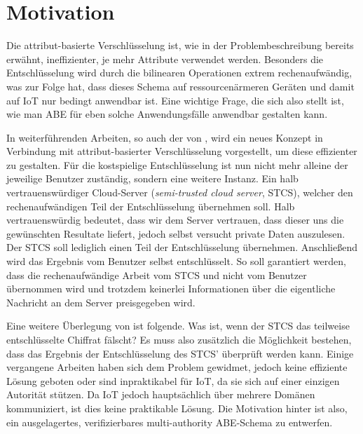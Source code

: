 \section{Motivation}
Die attribut-basierte Verschlüsselung ist, wie in der Problembeschreibung
bereits erwähnt, ineffizienter, je mehr Attribute verwendet werden. Besonders
die Entschlüsselung wird durch die bilinearen Operationen extrem
rechenaufwändig, was zur Folge hat, dass dieses Schema auf ressourcenärmeren
Geräten und damit auf IoT nur bedingt anwendbar ist. Eine wichtige Frage, die
sich also stellt ist, wie man ABE für eben solche Anwendungsfälle anwendbar
gestalten kann.

In weiterführenden Arbeiten, so auch der von \cite{green}, wird ein neues
Konzept in Verbindung mit attribut-basierter Verschlüsselung vorgestellt, um
diese effizienter zu gestalten. Für die kostspielige Entschlüsselung ist nun
nicht mehr alleine der jeweilige Benutzer zuständig, sondern eine weitere
Instanz. Ein halb vertrauenswürdiger Cloud-Server (\textit{semi-trusted cloud
server}, STCS), welcher den rechenaufwändigen Teil der Entschlüsselung
übernehmen soll. Halb vertrauenswürdig bedeutet, dass wir dem Server
vertrauen, dass dieser uns die gewünschten Resultate liefert, jedoch selbst
versucht private Daten auszulesen. Der STCS soll lediglich einen Teil der
Entschlüsselung übernehmen. Anschließend wird das Ergebnis vom Benutzer selbst
entschlüsselt. So soll garantiert werden, dass die rechenaufwändige Arbeit vom
STCS und nicht vom Benutzer übernommen wird und trotzdem keinerlei
Informationen über die eigentliche Nachricht an dem Server preisgegeben wird.

Eine weitere Überlegung von \cite{phoabe} ist folgende. Was ist, wenn der STCS
das teilweise entschlüsselte Chiffrat fälscht? Es muss also zusätzlich die
Möglichkeit bestehen, dass das Ergebnis der Entschlüsselung des STCS'
überprüft werden kann. Einige vergangene Arbeiten haben sich dem Problem
gewidmet, jedoch keine effiziente Lösung geboten oder sind inpraktikabel für
IoT, da sie sich auf einer einzigen Autorität stützen. Da IoT jedoch
hauptsächlich über mehrere Domänen kommuniziert, ist dies keine praktikable
Lösung. Die Motivation hinter \cite{phoabe} ist also, ein ausgelagertes,
verifizierbares multi-authority ABE-Schema zu entwerfen.
